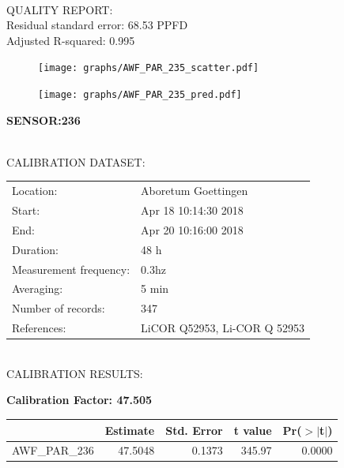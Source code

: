 \documentclass[oneside]{report}
\begin{document}
\hrulefill\\
QUALITY REPORT:\\
Residual standard error: 68.53 PPFD\\
Adjusted R-squared: 0.995



\begin{figure}[H]
  \centering
  \texttt{[image: graphs/AWF\_PAR\_235\_scatter.pdf]}
\end{figure}




\begin{figure}[H]
  \centering
  \texttt{[image: graphs/AWF\_PAR\_235\_pred.pdf]}
\end{figure}

\pagebreak


\begin{center}
\large{\textbf{SENSOR:236}}\\
\end{center}

\hrulefill\\
CALIBRATION DATASET:\\
\begin{table}[h!]
  \centering
  \label{tab:table1}
  \begin{tabular}{ll}
    Location: & Aboretum Goettingen\\ 
    
    
    Start:  & Apr 18 10:14:30 2018 \\
    End:   & Apr 20 10:16:00 2018\\ 
    Duration: & 48 h\\
    Measurement frequency: & 0.3hz\\
    Averaging:  &5 min\\
    Number of records: & 347 \\
    References: & LiCOR Q52953, Li-COR Q 52953 \\
  \end{tabular}
\end{table}

\hrulefill\\
CALIBRATION RESULTS:\\


\begin{center}
\textbf{\large{Calibration Factor: 47.505}}\\
\end{center}
\begin{table}[ht]
\centering
\begin{tabular}{rrrrr}
  \hline
 & Estimate & Std. Error & t value & Pr($>$$|$t$|$) \\ 
  \hline
AWF\_PAR\_236 & 47.5048 & 0.1373 & 345.97 & 0.0000 \\ 
   \hline
\end{tabular}
\end{table}
\end{document}
